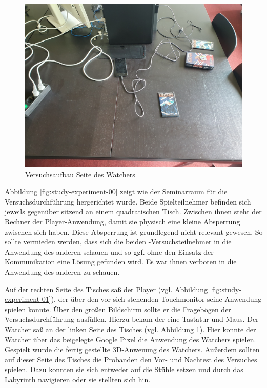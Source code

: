 \begin{figure}[ht]
\centering
\includegraphics[width=1\linewidth]{content/pictures/Aufbau_02.jpg}
\caption{Versuchsaufbau Seite des Watchers}
\label{fig:study-experiment-02}
\end{figure}

Abbildung \ref{fig:study-experiment-00} zeigt wie der Seminarraum für die Versuchsdurchführung hergerichtet wurde. Beide Spielteilnehmer befinden sich jeweils gegenüber sitzend an einem quadratischen Tisch. Zwischen ihnen steht der Rechner der Player-Anwendung, damit sie physisch eine kleine Absperrung zwischen sich haben. Diese Absperrung ist grundlegend nicht relevant gewesen. So sollte vermieden werden, dass sich die beiden -Versuchsteilnehmer in die Anwendung des anderen schauen und so ggf. ohne den Einsatz der Kommunikation eine Lösung gefunden wird. Es war ihnen verboten in die Anwendung des anderen zu schauen.

Auf der rechten Seite des Tisches saß der Player (vgl. Abbildung \ref{fig:study-experiment-01}), der über den vor sich stehenden Touchmonitor seine Anwendung spielen konnte. Über den großen Bildschirm sollte er die Fragebögen der Versuchsdurchführung ausfüllen. Hierzu bekam der eine Tastatur und Maus. Der Watcher saß an der linken Seite des Tisches (vgl. Abbildung \ref{fig:study-experiment-02}). Hier konnte der Watcher über das beigelegte Google Pixel die Anwendung des Watchers spielen. Gespielt wurde die fertig gestellte \ac{3D}-Anwenung des Watchers. Außerdem sollten auf dieser Seite des Tisches die Probanden den Vor- und Nachtest des Versuches spielen. Dazu konnten sie sich entweder auf die Stühle setzen und durch das Labyrinth navigieren oder sie stellten sich hin.

